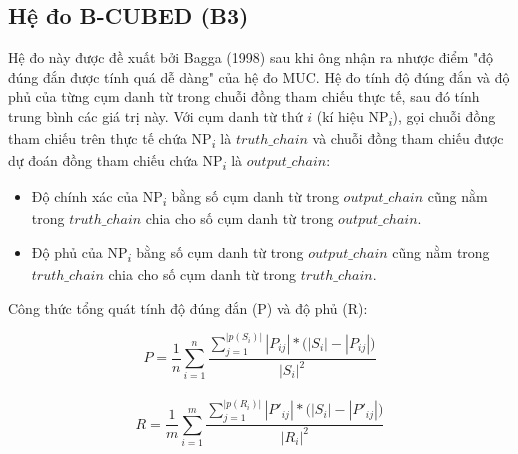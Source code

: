 \documentclass[12pt]{report}
\begin{document}
					\subsection*{Hệ đo B-CUBED (B3)}
					\par Hệ đo này được đề xuất bởi Bagga (1998)\cite{bagga98} sau khi ông nhận ra nhược điểm "độ đúng đắn được tính quá dễ dàng" của hệ đo MUC. Hệ đo tính độ đúng đắn và độ phủ của từng cụm danh từ trong chuỗi đồng tham chiếu thực tế, sau đó tính trung bình các giá trị này. Với cụm danh từ thứ $i$ (kí hiệu NP\textsubscript{$i$}), gọi chuỗi đồng tham chiếu trên thực tế chứa NP\textsubscript{$i$} là $truth\_chain$ và chuỗi đồng tham chiếu được dự đoán đồng tham chiếu chứa NP\textsubscript{$i$} là $output\_chain$:
					\begin{itemize}
						\item{Độ chính xác của NP\textsubscript{$i$} bằng số cụm danh từ trong $output\_chain$ cũng nằm trong $truth\_chain$ chia cho số cụm danh từ trong $output\_chain$}.
						\item{Độ phủ của NP\textsubscript{$i$} bằng số cụm danh từ trong $output\_chain$ cũng nằm trong $truth\_chain$ chia cho số cụm danh từ trong $truth\_chain$}.
					\end{itemize}
					\par Công thức tổng quát tính độ đúng đắn (P) và độ phủ (R):
					\begin{center}
						\begin{equation*}
							P = \frac{1}{n} \sum_{i=1}^{n} \frac{\sum_{j=1}^{|p (S_i)|} |P_{ij}|*\big(|S_i| - |P_{ij}|)} {|S_{i}|^2}
						\end{equation*}
						\\
						\begin{equation*}
							R = \frac{1}{m} \sum_{i=1}^{m} \frac{\sum_{j=1}^{|p (R_i)|} |P'_{ij}|*\big(|S_i| - |P'_{ij}|)} {|R_{i}|^2}
						\end{equation*}												
					\end{center}
\end{document}
